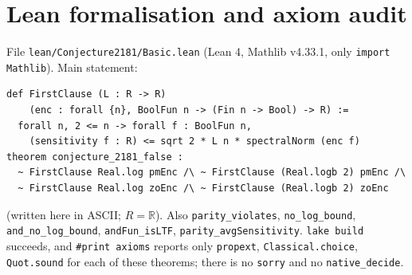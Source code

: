 \documentclass[11pt]{article}
\theoremstyle{definition}
\begin{document}
\section{Lean formalisation and axiom audit}
File \texttt{lean/Conjecture2181/Basic.lean} (Lean 4, Mathlib v4.33.1, only \texttt{import Mathlib}).
Main statement:
\begin{verbatim}
def FirstClause (L : R -> R)
    (enc : forall {n}, BoolFun n -> (Fin n -> Bool) -> R) :=
  forall n, 2 <= n -> forall f : BoolFun n,
    (sensitivity f : R) <= sqrt 2 * L n * spectralNorm (enc f)
theorem conjecture_2181_false :
  ~ FirstClause Real.log pmEnc /\ ~ FirstClause (Real.logb 2) pmEnc /\
  ~ FirstClause Real.log zoEnc /\ ~ FirstClause (Real.logb 2) zoEnc
\end{verbatim}
(written here in ASCII; $R=\mathbb R$). Also \texttt{parity\_violates}, \texttt{no\_log\_bound},
\texttt{and\_no\_log\_bound}, \texttt{andFun\_isLTF}, \texttt{parity\_avgSensitivity}.
\texttt{lake build} succeeds, and \texttt{\#print axioms} reports only
\texttt{propext}, \texttt{Classical.choice}, \texttt{Quot.sound} for each of these theorems;
there is no \texttt{sorry} and no \texttt{native\_decide}.
\end{document}
